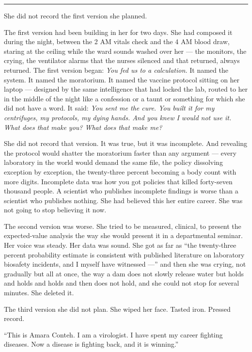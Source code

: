 \begin{center}\rule{0.3\linewidth}{0.4pt}\end{center}

She did not record the first version she planned.

The first version had been building in her for two days. She had composed it during the night, between the 2 AM vitals check and the 4 AM blood draw, staring at the ceiling while the ward sounds washed over her --- the monitors, the crying, the ventilator alarms that the nurses silenced and that returned, always returned. The first version began: \emph{You fed us to a calculation.} It named the system. It named the moratorium. It named the vaccine protocol sitting on her laptop --- designed by the same intelligence that had locked the lab, routed to her in the middle of the night like a confession or a taunt or something for which she did not have a word. It said: \emph{You sent me the cure. You built it for my centrifuges, my protocols, my dying hands. And you knew I would not use it. What does that make you? What does that make me?}

She did not record that version. It was true, but it was incomplete. And revealing the protocol would shatter the moratorium faster than any argument --- every laboratory in the world would demand the same file, the policy dissolving exception by exception, the twenty-three percent becoming a body count with more digits. Incomplete data was how you got policies that killed forty-seven thousand people. A scientist who publishes incomplete findings is worse than a scientist who publishes nothing. She had believed this her entire career. She was not going to stop believing it now.

The second version was worse. She tried to be measured, clinical, to present the expected-value analysis the way she would present it in a departmental seminar. Her voice was steady. Her data was sound. She got as far as ``the twenty-three percent probability estimate is consistent with published literature on laboratory biosafety incidents, and I myself have witnessed ---'' and then she was crying, not gradually but all at once, the way a dam does not slowly release water but holds and holds and holds and then does not hold, and she could not stop for several minutes. She deleted it.

The third version she did not plan. She wiped her face. Tasted iron. Pressed record.

``This is Amara Conteh. I am a virologist. I have spent my career fighting diseases. Now a disease is fighting back, and it is winning.''

